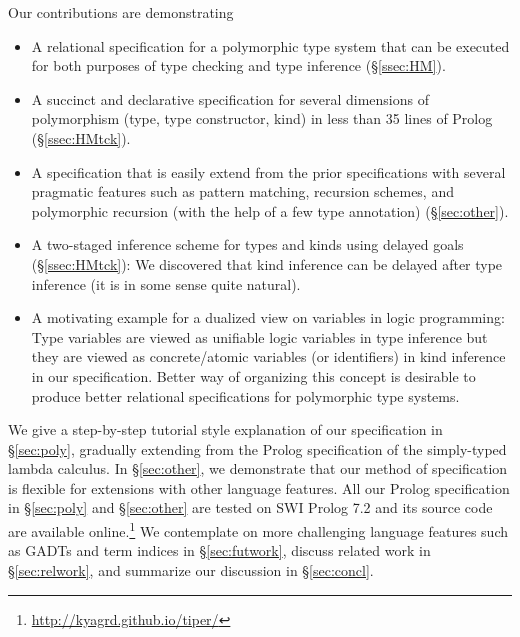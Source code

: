 Our contributions are demonstrating
\begin{itemize}\vspace*{-1ex}
\item A relational specification for a polymorphic type system that can be
	executed for both purposes of type checking and type inference
	(\S\ref{ssec:HM}).
\item A succinct and declarative specification for several dimensions of
	polymorphism (type, type constructor, kind) in less than 35 lines
	of Prolog (\S\ref{ssec:HMtck}).
\item A specification that is easily extend from the prior specifications
	with several pragmatic features such as pattern matching,
	recursion schemes, and polymorphic recursion (with the help of
	a few type annotation) (\S\ref{sec:other}).
\item A two-staged inference scheme for types and kinds using delayed goals
	(\S\ref{ssec:HMtck}):
	We discovered that kind inference can be delayed after type inference
	(it is in some sense quite natural).
\item A motivating example for a dualized view on variables
	in logic programming:
	Type variables are viewed as unifiable logic variables
	in type inference but they are viewed as concrete/atomic
	variables (or identifiers) in kind inference in our specification.
	Better way of organizing this concept is desirable to produce
	better relational specifications for polymorphic type systems.
\end{itemize}

We give a step-by-step tutorial style explanation of our specification in
\S\ref{sec:poly}, gradually extending from the Prolog specification of
the simply-typed lambda calculus. In \S\ref{sec:other}, we demonstrate
that our method of specification is flexible for extensions with
other language features. All our Prolog specification in \S\ref{sec:poly}
and \S\ref{sec:other} are tested on SWI Prolog 7.2 and its source code are
available online.\footnote{
	\url{http://kyagrd.github.io/tiper/} }\label{githubURL}
We contemplate on more challenging language features such as GADTs and
term indices in \S\ref{sec:futwork}, discuss related work in
\S\ref{sec:relwork}, and summarize our discussion in \S\ref{sec:concl}.

